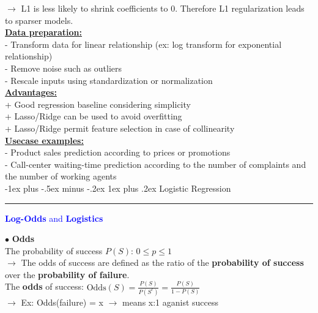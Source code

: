 \documentclass[letterpaper, 10.5pt,landscape]{article}
\makeatletter
\renewcommand{\subsubsection}{\@startsection{subsubsection}{3}{0mm}%
                                {-1ex plus -.5ex minus -.2ex}%
                                {1ex plus .2ex}%
                                {\normalfont\small\bfseries}}
\makeatother
\begin{document}
\begin{multicols*}{3}
$\rightarrow$ L1 is less likely to shrink coefficients to 0. Therefore L1 regularization leads to sparser models. \\

\vspace{5pt}
\textbf{\underline{Data preparation:}} \\
- Transform data for linear relationship (ex: log transform for exponential relationship) \\
- Remove noise such as outliers \\
- Rescale inputs using standardization or normalization \\

\vspace{3pt}
\textbf{\underline{Advantages:}} \\
+ Good regression baseline considering simplicity \\
+ Lasso/Ridge can be used to avoid overfitting \\
+ Lasso/Ridge permit feature selection in case of collinearity \\

\vspace{3pt}
\textbf{\underline{Usecase examples:}} \\
- Product sales prediction according to prices or promotions \\
- Call-center waiting-time prediction according to the number of complaints and the number of working agents \\





\subsubsection{Logistic Regression} {\color{teal}\hrule height 0.5pt} \smallskip



\textcolor{blue}{\textbf{Log-Odds} and \textbf{Logistics}} 

\vspace{2pt}
$\bullet$ \textbf{Odds} \\
The probability of success $P(S)$:  \( 0 \leq p \leq 1\)\\
$\rightarrow$ The odds of success are defined as the ratio of the \textbf{probability of success} over the \textbf{probability of failure}. \\
The \textbf{odds} of success: \( \text{Odds}(S) = \frac{P(S)}{P(S^{c})} = \frac{P(S)}{1-P(S)} \) \\
$\rightarrow$ Ex: Odds(failure) = x $\rightarrow$ means x:1 aganist success \\


\end{multicols*}
\end{document}
